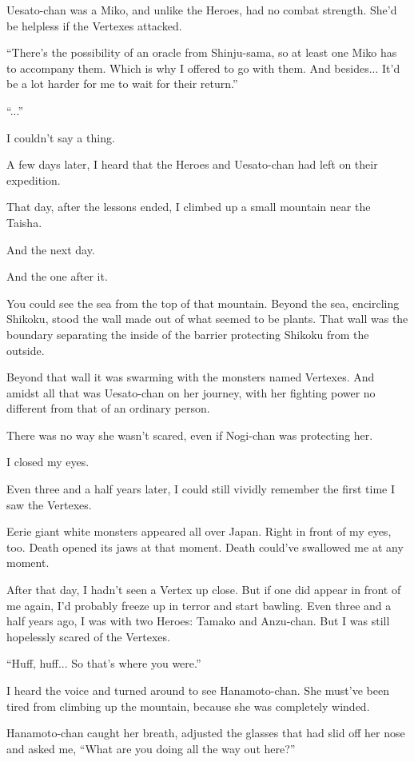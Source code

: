 Uesato-chan was a Miko, and unlike the Heroes, had no combat strength. She'd be helpless if the Vertexes attacked.

``There's the possibility of an oracle from Shinju-sama, so at least one Miko has to accompany them. Which is why I offered to go with them. And besides... It'd be a lot harder for me to wait for their return.''

``...''

I couldn't say a thing.

A few days later, I heard that the Heroes and Uesato-chan had left on their expedition.

That day, after the lessons ended, I climbed up a small mountain near the Taisha.

And the next day.

And the one after it.

You could see the sea from the top of that mountain. Beyond the sea, encircling Shikoku, stood the wall made out of what seemed to be plants. That wall was the boundary separating the inside of the barrier protecting Shikoku from the outside.

Beyond that wall it was swarming with the monsters named Vertexes. And amidst all that was Uesato-chan on her journey, with her fighting power no different from that of an ordinary person.

There was no way she wasn't scared, even if Nogi-chan was protecting her.

I closed my eyes.

Even three and a half years later, I could still vividly remember the first time I saw the Vertexes.

Eerie giant white monsters appeared all over Japan. Right in front of my eyes, too. Death opened its jaws at that moment. Death could've swallowed me at any moment.

After that day, I hadn't seen a Vertex up close. But if one did appear in front of me again, I'd probably freeze up in terror and start bawling. Even three and a half years ago, I was with two Heroes: Tamako and Anzu-chan. But I was still hopelessly scared of the Vertexes.

``Huff, huff... So that's where you were.''

I heard the voice and turned around to see Hanamoto-chan. She must've been tired from climbing up the mountain, because she was completely winded.

Hanamoto-chan caught her breath, adjusted the glasses that had slid off her nose and asked me, ``What are you doing all the way out here?''

